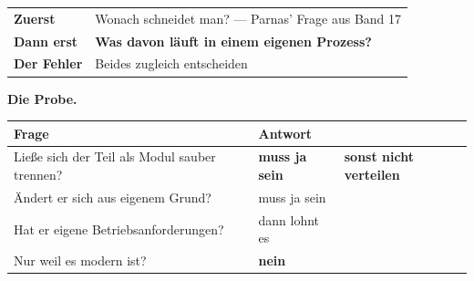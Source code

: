 \begin{merksatz}
\begin{center}
\renewcommand{\arraystretch}{1.55}
\begin{tabular}{@{}P{2.8cm}P{6.0cm}@{}}
\toprule
\textbf{Zuerst} & Wonach schneidet man? --- Parnas' Frage aus Band 17\\
\textbf{Dann erst} & \textbf{Was davon läuft in einem eigenen Prozess?}\\
\textbf{Der Fehler} & Beides zugleich entscheiden\\
\bottomrule
\end{tabular}
\end{center}

\begin{center}
\begin{minipage}{0.88\textwidth}
\end{minipage}
\end{center}

\textbf{Die Probe.}

\begin{center}
\renewcommand{\arraystretch}{1.5}
\begin{tabular}{@{}P{3.0cm}P{2.2cm}P{2.8cm}@{}}
\toprule
\textbf{Frage} & \textbf{Antwort} & \\
\midrule
Ließe sich der Teil als Modul sauber trennen? & \textcolor{gruen}{\textbf{muss ja sein}} & \textbf{sonst nicht verteilen}\\
Ändert er sich aus eigenem Grund? & \textcolor{gruen}{muss ja sein} & \\
Hat er eigene Betriebsanforderungen? & \textcolor{gruen}{dann lohnt es} & \\
Nur weil es modern ist? & \textcolor{akzent}{\textbf{nein}} & \\
\bottomrule
\end{tabular}
\end{center}

\begin{center}
\end{center}


\end{merksatz}
